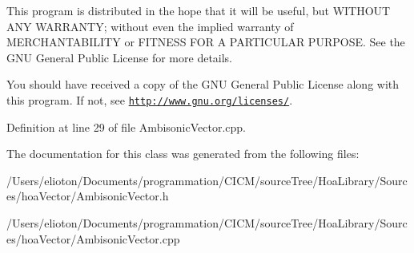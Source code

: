 This program is distributed in the hope that it will be useful, but W\-I\-T\-H\-O\-U\-T A\-N\-Y W\-A\-R\-R\-A\-N\-T\-Y; without even the implied warranty of M\-E\-R\-C\-H\-A\-N\-T\-A\-B\-I\-L\-I\-T\-Y or F\-I\-T\-N\-E\-S\-S F\-O\-R A P\-A\-R\-T\-I\-C\-U\-L\-A\-R P\-U\-R\-P\-O\-S\-E. See the G\-N\-U General Public License for more details.

You should have received a copy of the G\-N\-U General Public License along with this program. If not, see \href{http://www.gnu.org/licenses/}{\tt http\-://www.\-gnu.\-org/licenses/}. 

Definition at line 29 of file Ambisonic\-Vector.\-cpp.



The documentation for this class was generated from the following files\-:\begin{DoxyCompactItemize}
\item 
/\-Users/elioton/\-Documents/programmation/\-C\-I\-C\-M/source\-Tree/\-Hoa\-Library/\-Sources/hoa\-Vector/Ambisonic\-Vector.\-h\item 
/\-Users/elioton/\-Documents/programmation/\-C\-I\-C\-M/source\-Tree/\-Hoa\-Library/\-Sources/hoa\-Vector/Ambisonic\-Vector.\-cpp\end{DoxyCompactItemize}
